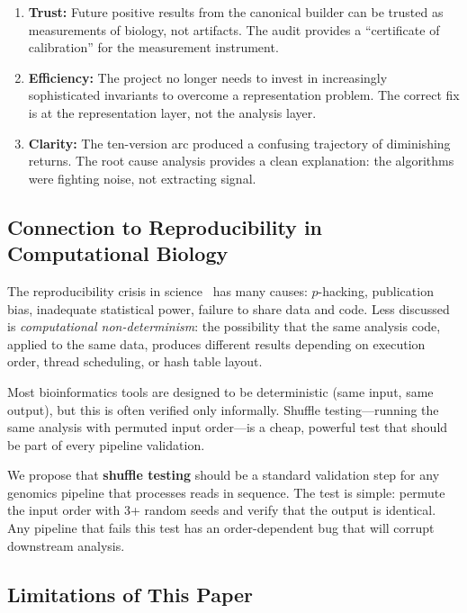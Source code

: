 \documentclass{../yalumba}
\begin{document}
\begin{enumerate}[leftmargin=2em]
  \item \textbf{Trust:} Future positive results from the canonical builder can
    be trusted as measurements of biology, not artifacts. The audit provides a
    ``certificate of calibration'' for the measurement instrument.
  \item \textbf{Efficiency:} The project no longer needs to invest in
    increasingly sophisticated invariants to overcome a representation problem.
    The correct fix is at the representation layer, not the analysis layer.
  \item \textbf{Clarity:} The ten-version arc produced a confusing trajectory
    of diminishing returns. The root cause analysis provides a clean explanation:
    the algorithms were fighting noise, not extracting signal.
\end{enumerate}

\subsection{Connection to Reproducibility in Computational Biology}

The reproducibility crisis in science~\cite{baker2016reproducibility,
peng2011reproducible} has many causes: $p$-hacking, publication bias, inadequate
statistical power, failure to share data and code. Less discussed is
\textit{computational non-determinism}: the possibility that the same analysis
code, applied to the same data, produces different results depending on
execution order, thread scheduling, or hash table layout.

Most bioinformatics tools are designed to be deterministic (same input, same
output), but this is often verified only informally. Shuffle testing---running
the same analysis with permuted input order---is a cheap, powerful test that
should be part of every pipeline validation.

\begin{keyfinding}
We propose that \textbf{shuffle testing} should be a standard validation step
for any genomics pipeline that processes reads in sequence. The test is simple:
permute the input order with 3+ random seeds and verify that the output is
identical. Any pipeline that fails this test has an order-dependent bug that
will corrupt downstream analysis.
\end{keyfinding}

\subsection{Limitations of This Paper}
\end{document}
